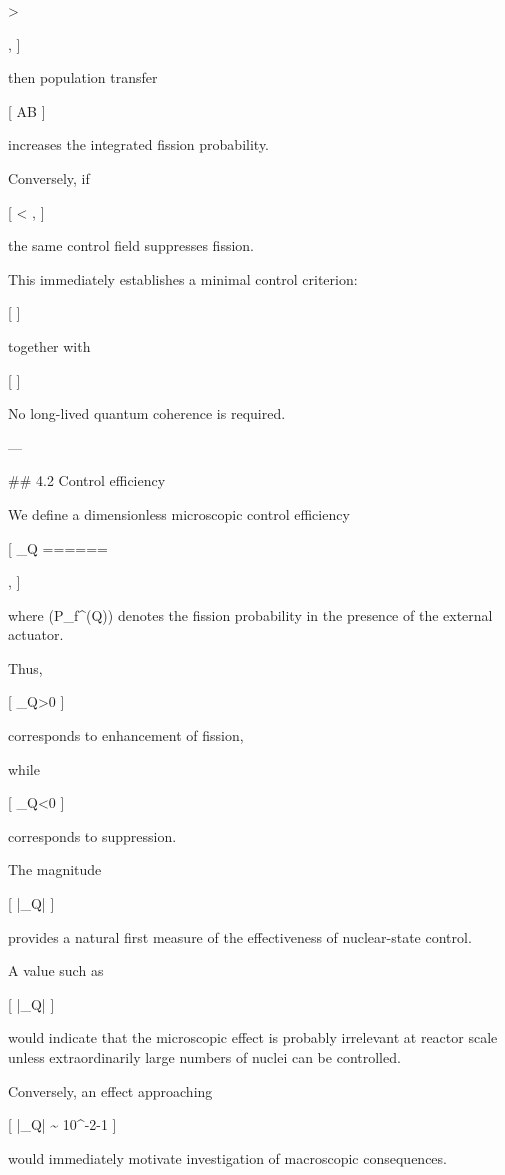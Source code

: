 >

,
]

then population transfer

[
A\rightarrow B
]

increases the integrated fission probability.

Conversely, if

[
<
,
]

the same control field suppresses fission.

This immediately establishes a minimal control criterion:

[
]

together with

[
]

No long-lived quantum coherence is required.

---

## 4.2 Control efficiency

We define a dimensionless microscopic control efficiency

[
\eta_Q
======

,
]

where (P_f^{(Q)}) denotes the fission probability in the presence of the external actuator.

Thus,

[
\eta_Q>0
]

corresponds to enhancement of fission,

while

[
\eta_Q<0
]

corresponds to suppression.

The magnitude

[
|\eta_Q|
]

provides a natural first measure of the effectiveness of nuclear-state control.

A value such as

[
|\eta_Q|
]

would indicate that the microscopic effect is probably irrelevant at reactor scale unless extraordinarily large numbers of nuclei can be controlled.

Conversely, an effect approaching

[
|\eta_Q|
\sim
10^{-2}-1
]

would immediately motivate investigation of macroscopic consequences.

